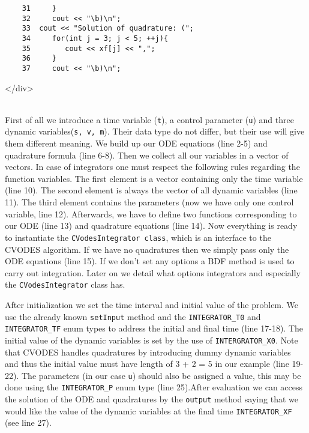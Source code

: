 \documentclass[a4paper,12pt]{book}
\newcommand{\codeend}{
\begin{rawhtml}
</div>
\end{rawhtml}
}
\begin{document}
{\begin{verbatim}
    31     }
    32     cout << "\b)\n";
    33  cout << "Solution of quadrature: (";
    34     for(int j = 3; j < 5; ++j){
    35        cout << xf[j] << ",";
    36     }
    37     cout << "\b)\n";
\end{verbatim}
\codeend\\
First of all we introduce a time variable (\texttt{t}), a control parameter (\texttt{u}) and three dynamic variables(\texttt{s, v, m}).
Their data type do not differ, but their use will give them different meaning. We build up our ODE equations (line 2-5) and quadrature formula
(line 6-8). Then we collect all our variables in a vector of vectors. In case of integrators one must respect the following rules regarding the
function variables. The first element
is a vector containing only the time variable (line 10). The second element is always the vector of all dynamic variables (line 11).
The third element contains the parameters (now we have only one control variable, line 12). Afterwards, we have to define two functions corresponding
to our ODE (line 13) and quadrature equations (line 14). Now everything is ready to instantiate the \texttt{CVodesIntegrator class}, which is an interface
to the CVODES algorithm. If we have no quadratures then we simply pass only the ODE equations (line 15). If we don't set any options a BDF method is used
to carry out integration. Later on we detail what options integrators and especially the \texttt{CVodesIntegrator} class has.
\par After initialization we set the time interval and initial value of the problem. We use the already known \texttt{setInput} method and the
\texttt{INTEGRATOR\_T0} and \texttt{INTEGRATOR\_TF} enum types to address the initial and final time (line 17-18). The initial value of the dynamic
variables is set by the use of \texttt{INTERGRATOR\_X0}. Note that CVODES handles quadratures by introducing dummy dynamic variables and thus the initial
value must have length of 3 + 2 = 5 in our example (line 19-22). The parameters (in our case \texttt{u}) should also be assigned a value, this may be done
using the \texttt{INTEGRATOR\_P} enum type (line 25).After evaluation we can access the solution of the ODE and quadratures by the \texttt{output} method
saying that we would like the value of the dynamic variables at the final time \texttt{INTEGRATOR\_XF} (see line 27).
}
\end{document}
